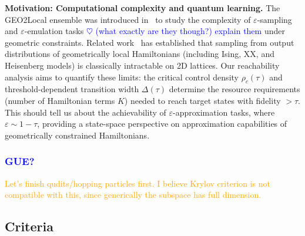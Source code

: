 \documentclass[aps,prx,reprint,superscriptaddress,footnote, twocolumn,notitlepage]{revtex4-2}
\newcommand{\yu}[1]{\textcolor{blue}{#1}}
\newcommand{\ko}[1]{\textcolor{orange}{#1}}
\newcommand{\todoyu}[1]{\yu{$\heartsuit$ #1}}
\begin{document}
\textbf{Motivation: Computational complexity and quantum learning.} The GEO2Local ensemble was introduced in~\cite{quek2025quantumadvantagerandomgeometricallytwolocal} to study the complexity of $\varepsilon$-sampling and $\varepsilon$-emulation tasks \todoyu{(what exactly are they though?) explain them} under geometric constraints. Related work~\cite{park2023hardnessquantumspindynamics} has established that sampling from output distributions of geometrically local Hamiltonians (including Ising, XX, and Heisenberg models) is classically intractable on 2D lattices. Our reachability analysis aims to quantify these limits: the critical control density $\rho_c(\tau)$ and threshold-dependent transition width $\Delta(\tau)$ determine the resource requirements (number of Hamiltonian terms $K$) needed to reach target states with fidelity $> \tau$. This should tell us about the achievability of $\varepsilon$-approximation tasks, where $\varepsilon \sim 1 - \tau$, providing a state-space perspective on approximation capabilities of geometrically constrained Hamiltonians.
\subsubsection{\yu{GUE?}}
\ko{Let's finish qudits/hopping particles first. I believe Krylov criterion is not compatible with this, since generically the subspace has full dimension.}
\subsection{Criteria}


\end{document}
